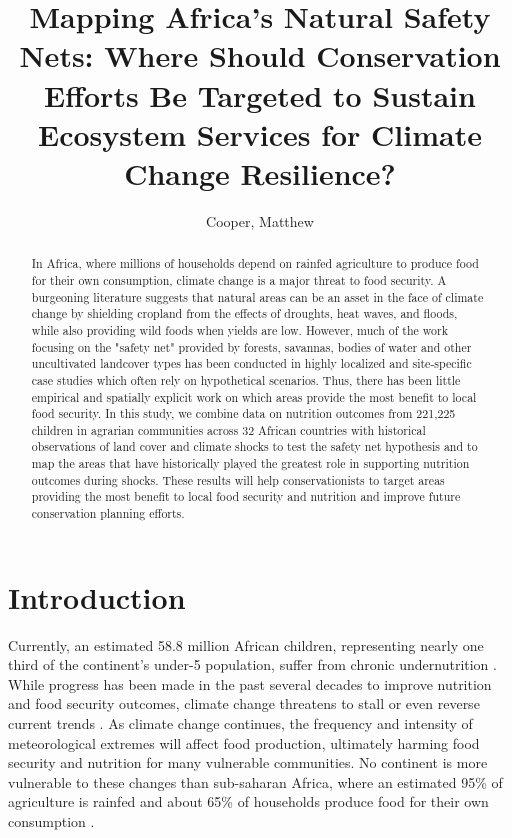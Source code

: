 \documentclass{article}
\begin{document}
\title{Mapping Africa's Natural Safety Nets: Where Should Conservation Efforts Be Targeted to Sustain Ecosystem Services for Climate Change Resilience?}

\author{
	Cooper, Matthew\\
}

\maketitle
\begin{abstract}

In Africa, where millions of households depend on rainfed agriculture to produce food for their own consumption, climate change is a major threat to food security.  A burgeoning literature suggests that natural areas can be an asset in the face of climate change by shielding cropland from the effects of droughts, heat waves, and floods, while also providing wild foods when yields are low.  However, much of the work focusing on the "safety net" provided by forests, savannas, bodies of water and other uncultivated landcover types has been conducted in highly localized and site-specific case studies which often rely on hypothetical scenarios.  Thus, there has been little empirical and spatially explicit work on which areas provide the most benefit to local food security.  In this study, we combine data on nutrition outcomes from 221,225 children in agrarian communities across 32 African countries with historical observations of land cover and climate shocks to test the safety net hypothesis and to map the areas that have historically played the greatest role in supporting nutrition outcomes during shocks.  These results will help conservationists to target areas providing the most benefit to local food security and nutrition and improve future conservation planning efforts.

\end{abstract}

\section{Introduction}

Currently, an estimated 58.8 million African children, representing nearly one third of the continent's under-5 population, suffer from chronic undernutrition \cite{unicef2019}.  While progress has been made in the past several decades to improve nutrition and food security outcomes, climate change threatens to stall or even reverse current trends \cite{FAO2018}.  As climate change continues, the frequency and intensity of meteorological extremes will affect food production, ultimately harming food security and nutrition for many vulnerable communities.  No continent is more vulnerable to these changes than sub-saharan Africa, where an estimated 95\% of agriculture is rainfed \cite{Wani2009} and about 65\% of households  produce food for their own consumption \cite{Runge2004}.
\end{document}
